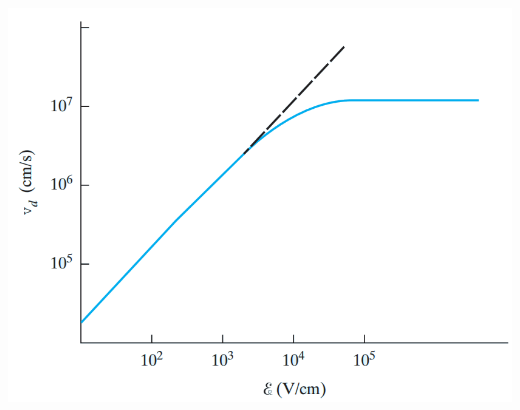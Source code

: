 \documentclass{article}
\begin{document}
\begin{large}
\begin{center}
	\includegraphics[width=\textwidth]{fig3}
	\end{center}
	
		
	\end{large}
\end{document}
